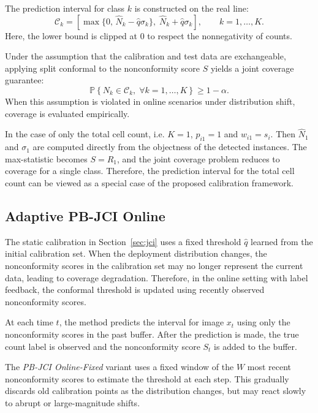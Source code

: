 \documentclass[smallextended,natbib]{svjour3}
\begin{document}
The prediction interval for class \(k\) is constructed on the real line:
\begin{equation}
\mathcal{C}_k
=
\left[
\max\{0,\,\hat{N}_k-\hat{q}\sigma_k\},\;
\hat{N}_k+\hat{q}\sigma_k
\right],
\qquad k=1,\dots,K.
\end{equation}
Here, the lower bound is clipped at 0 to respect the nonnegativity of counts.

Under the assumption that the calibration and test data are exchangeable, applying
split conformal to the nonconformity score \(S\) yields a joint coverage
guarantee:
\begin{equation}
\mathbb{P}\left\{
N_k \in \mathcal{C}_k,\; \forall k=1,\dots,K
\right\}
\geq 1-\alpha.
\end{equation}
When this assumption is violated in online scenarios under distribution shift,
coverage is evaluated empirically.

In the case of only the total cell count, i.e. \(K=1\), \(p_{i1}=1\) and
\(w_{i1}=s_i\). Then \(\hat{N}_1\) and \(\sigma_1\) are computed directly from the
objectness of the detected instances. The max-statistic becomes \(S=R_1\), and the
joint coverage problem reduces to coverage for a single class. Therefore, the
prediction interval for the total cell count can be viewed as a special case of
the proposed calibration framework.

\subsection{Adaptive PB-JCI Online}\label{sec:adaptive}

The static calibration in Section~\ref{sec:jci} uses a fixed threshold \(\hat{q}\)
learned from the initial calibration set. When the deployment distribution
changes, the nonconformity scores in the calibration set may no longer represent
the current data, leading to coverage degradation. Therefore, in the online
setting with label feedback, the conformal threshold is updated using recently
observed nonconformity scores.

At each time \(t\), the method predicts the interval for image \(x_t\) using only
the nonconformity scores in the past buffer. After the prediction is made, the
true count label is observed and the nonconformity score \(S_t\) is added to the
buffer.

The \emph{PB-JCI Online-Fixed} variant uses a fixed window of the \(W\) most recent
nonconformity scores to estimate the threshold at each step. This gradually
discards old calibration points as the distribution changes, but may react slowly
to abrupt or large-magnitude shifts.
\end{document}
